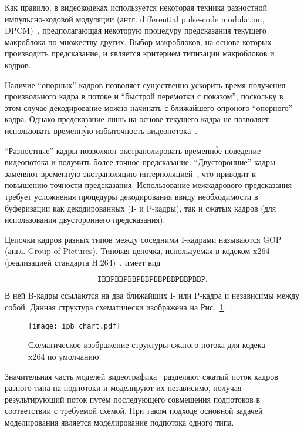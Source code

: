 Как правило, в видеокодеках используется некоторая техника
разностной импульсно-кодовой модуляции (англ. differential
pulse-code modulation, DPCM)~\cite{}, предполагающая некоторую
процедуру предсказания текущего макроблока по множеству других.
Выбор макроблоков, на основе которых производить предсказание,
и является критерием типизации макроблоков и кадров.

Наличие ``опорных'' кадров позволяет существенно ускорить
время получения произвольного кадра в потоке и ``быстрой
перемотки с показом'', поскольку в этом случае декодирование
можно начинать с ближайшего опроного ``опорного'' кадра.
Однако предсказание лишь на основе текущего кадра не
позволяет использовать временн\`{у}ю избыточность
видеопотока~\cite{}.

``Разностные'' кадры позволяют
экстраполировать временн\`{о}е поведение видеопотока
и получить более точное предсказание. ``Двусторонние''
кадры заменяют временн\`{у}ю экстраполяцию интерполяцией~\cite{},
что приводит к повышению точности предсказания.
Использование межкадрового предсказания требует
усложнения процедуры декодирования ввиду необходимости в
буферизации как декодированных (I- и P-кадры), так и
сжатых кадров (для использования двустороннего предсказания).

Цепочки кадров разных типов между соседними I-кадрами называются
GOP (англ. Group of Pictures). Типовая цепочка, используемая
в кодеком x264 (реализацией стандарта H.264)~\cite{},
имеет вид

$$
\mathtt{IBBPBBPBBPBBPBBPBBPBBPBBP}.
$$

В ней B-кадры
ссылаются на два ближайших I- или P-кадра и независимы
между собой. Данная структура схематически изображена
на Рис.~\ref{fig:ipb_frames}.

\begin{figure}[h]
    \begin{center}
        \texttt{[image: ipb\_chart.pdf]}
    \end{center}
    \caption{Схематическое изображение структуры сжатого потока
    для кодека x264 по умолчанию}
    \label{fig:ipb_frames}
\end{figure}

Значительная часть моделей видеотрафика~\cite{} разделяют
сжатый поток кадров разного типа на подпотоки и моделируют
их независимо, получая результирующий поток путём последующего
совмещения подпотоков в соответствии с требуемой схемой.
При таком подходе основной задачей моделирования является
моделирование подпотока одного типа.

